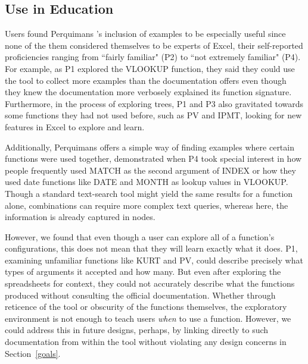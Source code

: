 \documentclass[conference]{IEEEtran}
\newcommand{\toolname}{Perquimans } \newcommand{\toolnameend}{Perquimans}
\begin{document}
	\subsection{Use in Education} Users found \toolname's inclusion of examples to
	be especially useful since none of the them considered themselves to be experts
	of Excel, their self-reported proficiencies ranging from ``fairly familiar"
	(P2) to ``not extremely familiar" (P4). For example, as P1 explored the VLOOKUP
	function, they said they could use the tool to collect more examples than the
	documentation offers even though they knew the documentation more verbosely
	explained its function signature. Furthermore, in the process of exploring
	trees, P1 and P3 also gravitated towards some functions they had not used
	before, such as PV and IPMT, looking for new features in Excel to explore and
	learn. \par
	
	Additionally, \toolname offers a simple way of finding examples where certain
	functions were used together, demonstrated when P4 took special interest in how
	people frequently used MATCH as the second argument of INDEX or how they used
	date functions like DATE and MONTH as lookup values in VLOOKUP. Though a
	standard text-search tool might yield the same results for a function alone,
	combinations can require more complex text queries, whereas here, the
	information is already captured in nodes.  \par
	
	However, we found that even though a user can explore all of a function's
	configurations, this does not mean that they will learn exactly what it does.
	P1, examining unfamiliar functions like KURT and PV, could describe precisely
	what types of arguments it accepted and how many. But even after exploring the
	spreadsheets for context, they could not accurately describe what the functions
	produced without consulting the official documentation. Whether through
	reticence of the tool or obscurity of the functions themselves, the exploratory
	environment is not enough to teach users \textit{when} to use a function.
	However, we could address this in future designs, perhaps, by linking directly
	to such documentation from within the tool without violating any design
	concerns in Section~\ref{goals}. \par
	
\end{document}
